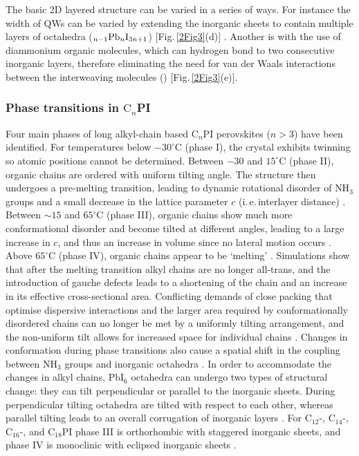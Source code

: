 The basic 2D layered structure can be varied in a series of ways. For instance the width of QWs	can be varied by extending the inorganic sheets to contain multiple layers of  octahedra ($_{n-1}\textnormal{Pb}_n\textnormal{I}_{3n+1}$) [Fig.\,\ref{2Fig3}(d)] \cite{Calabrese1991}. Another is with the use of diammonium organic molecules, which can hydrogen bond to two consecutive inorganic layers, therefore eliminating the need for van der Waals interactions between the interweaving molecules () [Fig.\,\ref{2Fig3}(e)].

\subsubsection{Phase transitions in $\textrm{C}_n$PI}
\label{sec:Cnphases}
Four main phases of long alkyl-chain based $\textrm{C}_n$PI perovskites ($n>3$) have been identified. For temperatures below $-30^{\circ}$C (phase I), the crystal exhibits twinning so atomic positions cannot be determined. Between $-30$ and $15^{\circ}$C  (phase II), organic chains are ordered with uniform tilting angle. The structure then undergoes a pre-melting transition, leading to dynamic rotational disorder of $\textrm{NH}_3$ groups and a small decrease in the lattice parameter $c$ (i.\,e.\,interlayer distance) \cite{Barman2003}. Between $\sim 15$ and $65^{\circ}$C (phase III), organic chains show much more conformational disorder and become tilted at different angles, leading to a large increase in $c$, and thus an increase in volume since no lateral motion occurs \cite{Barman2003}. Above $65^{\circ}$C (phase IV), organic chains appear to be `melting' \cite{Ishihara1990, Xu1991, Ishihara1989}. Simulations show that after the melting transition alkyl chains are no longer all-trans, and the introduction of gauche defects leads to a shortening of the chain and an increase in its effective cross-sectional area. Conflicting demands of close packing that optimise dispersive interactions and the larger area required by conformationally disordered chains can no longer be met by a uniformly tilting arrangement, and the non-uniform tilt allows for increased space for individual chains \cite{Naik2010}. Changes in conformation during phase transitions also cause a spatial shift in the coupling between $\textrm{NH}_3$ groups and inorganic octahedra \cite{Pradeesh2009}. In order to accommodate the changes in alkyl chains, $\textrm{PbI}_6$ octahedra can undergo two types of structural change: they can tilt perpendicular or parallel to the inorganic sheets. During perpendicular tilting octahedra are tilted with respect to each other, whereas parallel tilting leads to an overall corrugation of inorganic layers \cite{Billing2008}. For $\textrm{C}_{12}$-, $\textrm{C}_{14}$-, $\textrm{C}_{16}$-, and $\textrm{C}_{18}$PI phase III is orthorhombic with staggered inorganic sheets, and phase IV is monoclinic with eclipsed inorganic sheets \cite{Billing2008}.    
